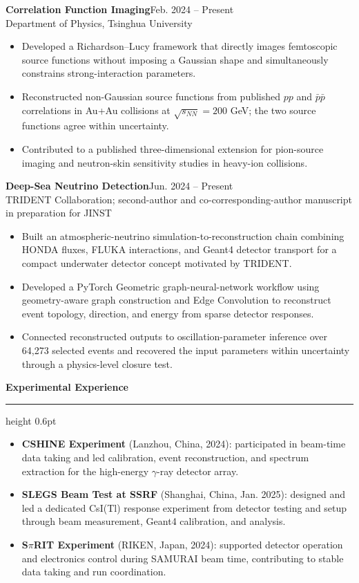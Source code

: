 \documentclass[10pt]{article}
\newcommand{\cvsection}[1]{%
  \vspace{0.75em}
  {\large\bfseries\color{accent} #1}\par
  \vspace{0.2em}
  {\color{rule}\hrule height 0.6pt}
  \vspace{0.45em}
}
\newcommand{\entry}[3]{%
  \textbf{#1}\hfill{\color{muted}#2}\\
  {\color{muted}#3}\par
}
\begin{document}
\entry{Correlation Function Imaging}{Feb. 2024 -- Present}{Department of Physics, Tsinghua University}
\begin{itemize}[leftmargin=1.25em,itemsep=1pt,topsep=2pt]
  \item Developed a Richardson--Lucy framework that directly images
    femtoscopic source functions without imposing a Gaussian shape and
    simultaneously constrains strong-interaction parameters.
  \item Reconstructed non-Gaussian source functions from published $pp$ and
    $\bar{p}\bar{p}$ correlations in Au+Au collisions at
    $\sqrt{s_{NN}}=200$ GeV; the two source functions agree within uncertainty.
  \item Contributed to a published three-dimensional extension for pion-source
    imaging and neutron-skin sensitivity studies in heavy-ion collisions.
\end{itemize}

\entry{Deep-Sea Neutrino Detection}{Jun. 2024 -- Present}{TRIDENT Collaboration; second-author and co-corresponding-author manuscript in preparation for JINST}
\begin{itemize}[leftmargin=1.25em,itemsep=1pt,topsep=2pt]
  \item Built an atmospheric-neutrino simulation-to-reconstruction chain
    combining HONDA fluxes, FLUKA interactions, and Geant4 detector transport
    for a compact underwater detector concept motivated by TRIDENT.
  \item Developed a PyTorch Geometric graph-neural-network workflow using
    geometry-aware graph construction and Edge Convolution to reconstruct event
    topology, direction, and energy from sparse detector responses.
  \item Connected reconstructed outputs to oscillation-parameter inference over
    64,273 selected events and recovered the input parameters within uncertainty
    through a physics-level closure test.
\end{itemize}

\cvsection{Experimental Experience}
\begin{itemize}[leftmargin=1.25em,itemsep=2pt,topsep=2pt]
  \item \textbf{CSHINE Experiment} (Lanzhou, China, 2024): participated in
    beam-time data taking and led calibration, event reconstruction, and
    spectrum extraction for the high-energy $\gamma$-ray detector array.
  \item \textbf{SLEGS Beam Test at SSRF} (Shanghai, China, Jan. 2025): designed
    and led a dedicated CsI(Tl) response experiment from detector testing and
    setup through beam measurement, Geant4 calibration, and analysis.
  \item \textbf{S$\pi$RIT Experiment} (RIKEN, Japan, 2024): supported detector operation and electronics control during SAMURAI beam time, contributing to stable data taking and run coordination.
\end{itemize}
\end{document}
